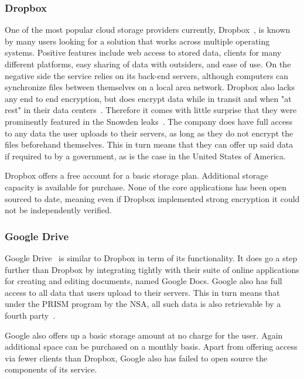 \subsubsection{Dropbox}

One of the most popular cloud storage providers currently, Dropbox~\cite{web:site:dropbox}, is known by many users looking for a solution that works across multiple operating systems.
Positive features include web access to stored data, clients for many different platforms, easy sharing of data with outsiders, and ease of use.
On the negative side the service relies on its back-end servers, although computers can synchronize files between themselves on a local area network.
Dropbox also lacks any end to end encryption, but does encrypt data while in transit and when "at rest" in their data centers~\cite{web:site:dropbox:blog}.
Therefore it comes with little surprise that they were prominently featured in the Snowden leaks~\cite{web:site:rt:dropbox}.
The company does have full access to any data the user uploads to their servers, as long as they do not encrypt the files beforehand themselves.
This in turn means that they can offer up said data if required to by a government, as is the case in the United States of America.

Dropbox offers a free account for a basic storage plan.
Additional storage capacity is available for purchase.
None of the core applications has been open sourced to date, meaning even if Dropbox implemented strong encryption it could not be independently verified.

\subsubsection{Google Drive}

Google Drive~\cite{web:site:gdrive} is similar to Dropbox in term of its functionality.
It does go a step further than Dropbox by integrating tightly with their suite of online applications for creating and editing documents, named Google Docs.
Google also has full access to all data that users upload to their servers.
This in turn means that under the PRISM program by the NSA, all such data is also retrievable by a fourth party~\cite{web:site:rt:google}.

Google also offers up a basic storage amount at no charge for the user.
Again additional space can be purchased on a monthly basis.
Apart from offering access via fewer clients than Dropbox, Google also has failed to open source the components of its service.

